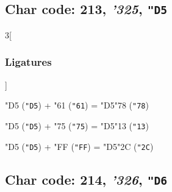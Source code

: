 \documentclass{article}
\newlength{\maxcharwidth}
\begin{document}
\subsection{Char code: 213, {\it'325}, {\tt"D5}}
\label{char_213}


\begin{multicols}{3}[\subsubsection{Ligatures}]

{\testfont\char"D5\noboundary} ({\tt"D5}) + {\testfont\char"61\noboundary} ({\tt"61}) = {\testfont\char"D5\noboundary}{\testfont\char"78\noboundary} ({\tt"78}) 

{\testfont\char"D5\noboundary} ({\tt"D5}) + {\testfont\char"75\noboundary} ({\tt"75}) = {\testfont\char"D5\noboundary}{\testfont\char"13\noboundary} ({\tt"13}) 

{\testfont\char"D5\noboundary} ({\tt"D5}) + {\testfont\char"FF\noboundary} ({\tt"FF}) = {\testfont\char"D5\noboundary}{\testfont\char"2C\noboundary} ({\tt"2C}) 

\end{multicols}

\subsection{Char code: 214, {\it'326}, {\tt"D6}}
\label{char_214}

\end{document}
